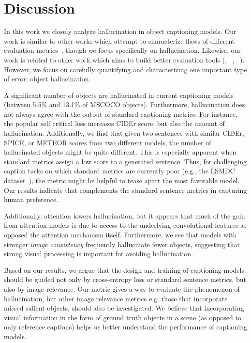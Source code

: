 \section{Discussion}

In this work we closely analyze hallucination in object captioning models.
Our work is similar to other works which attempt to characterize flaws of different evaluation metrics~\cite{kilickaya2016re}, though we focus specifically on hallucination.
Likewise, our work is related to other work which aims to build better evaluation tools (\cite{cider}, ~\cite{spice}, ~\cite{cui2018learning}).
However, we focus on carefully quantifying and characterizing one important type of error: object hallucination.

A significant number of objects are hallucinated in current captioning models (between 5.5\% and 13.1\% of MSCOCO objects).
Furthermore, hallucination does not always agree with the output of standard captioning metrics. 
For instance, the popular self critical loss increases CIDEr score, but also the amount of hallucination.
Additionally, we find that given two sentences with similar CIDEr, SPICE, or METEOR scores from two different models, the number of hallucinated objects might be quite different.
This is especially apparent when standard metrics assign a low score to a generated sentence.
Thus, for challenging caption tasks on which standard metrics are currently poor (e.g., the LSMDC dataset~\cite{rohrbach2017movie}), the \metric{} metric might be helpful to tease apart the most favorable model. Our results indicate that \metric{} complements the standard sentence metrics in capturing human preference.

%
%
%
%
%

Additionally, attention lowers hallucination, but it appears that much of the gain from attention models is due to access to the underlying convolutional features as opposed the attention mechanism itself.
Furthermore, we see that models with stronger \emph{image consistency} frequently hallucinate fewer objects, suggesting that strong visual processing is important for avoiding hallucination.

Based on our results, we argue that the design and training of captioning models should be guided not only by cross-entropy loss or standard sentence metrics, but also by image relevance.
Our \metric{} metric gives a way to evaluate the phenomenon of hallucination, but other image relevance metrics e.g. those that incorporate missed salient objects, should also be investigated. We believe that incorporating visual information in the form of ground truth objects in a scene (as opposed to only reference captions) helps us better understand the performance of captioning models.

%
%

%

%

